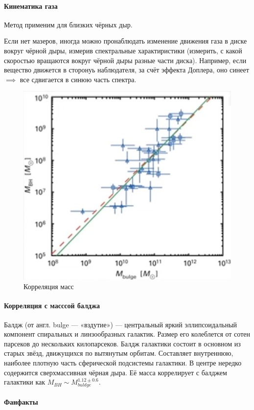 \paragraph{Кинематика газа} Метод применим для близких чёрных дыр.


Если нет мазеров, иногда можно пронаблюдать изменение движения газа в диске вокруг чёрной дыры, измерив спектральные характиристики (измерить, с какой скоростью вращаются вокруг чёрной дыры разные части диска). Например, если вещество движется в сторонуь наблюдателя, за счёт эффекта Доплера, оно синеет $\implies$ все сдвигается в синюю часть спектра.

\newpage

\begin{figure}
  \centering
    \includegraphics[width=0.7\linewidth]{Pictures/14_kor.png}
  \caption{Корреляция масс}
  \label{fig:14_kor}
 \end{figure}
\paragraph{Корреляция с масссой балджа}

Балдж (от англ. bulge — «вздутие») — центральный яркий эллипсоидальный компонент спиральных и линзообразных галактик. Размер его колеблется от сотен парсеков до нескольких килопарсеков. Балдж галактики состоит в основном из старых звёзд, движущихся по вытянутым орбитам. Составляет внутреннюю, наиболее плотную часть сферической подсистемы галактики. В центре нередко содержится сверхмассивная чёрная дыра. Её масса коррелирует с балджем галактики как $M_{BH}\sim M_{buldge}^{1.12\pm 0.6}$.


\paragraph{Фанфакты}
